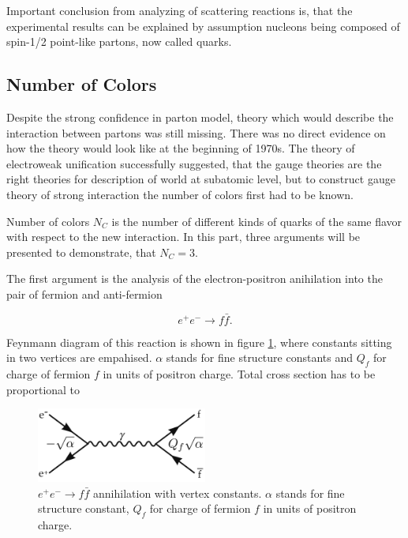 \documentclass[a4paper,11pt]{report}
\begin{document}
Important conclusion from analyzing of scattering reactions is, that the
experimental results can be explained by assumption nucleons being composed of
spin-1/2 point-like partons, now called quarks. 

\subsection{Number of Colors}

Despite the strong confidence in parton model, theory which would describe the
interaction between partons was still missing. There was no direct evidence on
how the theory would look like at the beginning of 1970s. The theory of electroweak
unification successfully suggested, that the gauge theories are the right
theories for description of world at subatomic level, but to construct gauge
theory of strong interaction the number of colors first had to be known.

Number of colors $N_C$ is the number of different kinds of quarks of the same
flavor with respect to the new interaction. In this part, three arguments will
be presented to demonstrate, that $N_C = 3$.

The first argument is the analysis of the electron-positron anihilation into the
pair of fermion and anti-fermion

\begin{equation}
  e^+e^- \rightarrow f\bar{f}.
  \label{ElectronPositronAnihilation}
\end{equation}

Feynmann diagram of this reaction is shown in figure \ref{fig:RRatio}, where
constants sitting in two vertices are empahised.  $\alpha$ stands for fine
structure constants and $Q_f$ for charge of fermion $f$ in units of positron
charge. Total cross section has to be proportional to

\begin{figure}[t]
  \centering
  \includegraphics[width=0.5\textwidth]{Chapter1/RRatio.png} 
  \caption{$e^+e^- \rightarrow f\bar{f}$ annihilation with vertex constants.
     $\alpha$ stands for fine structure constant, $Q_f$ for charge of fermion $f$
     in units of positron charge.}
  \label{fig:RRatio}
\end{figure}
\end{document}
